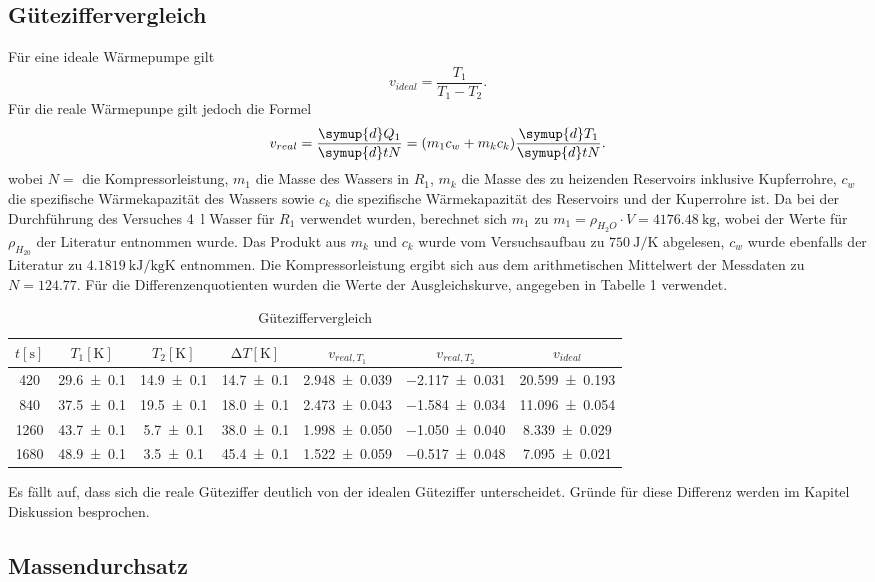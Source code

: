 \subsection{Güteziffervergleich}
Für eine ideale Wärmepumpe gilt
\begin{equation}
  v_{ideal} = \frac{T_1}{T_1-T_2}.
\end{equation}
Für die reale Wärmepunpe gilt jedoch die Formel
\begin{equation}
  v_{real}= \frac{\symup{d} Q_1}{\symup{d} tN} = (m_1c_w+m_kc_k)\frac{\symup{d} T_1}{\symup{d} tN}.
\end{equation}
wobei $ N = $ die Kompressorleistung, $ m_1$ die Masse des Wassers in $ R_1 $, $m_k$ die Masse des zu heizenden Reservoirs inklusive Kupferrohre, $ c_w $ die spezifische Wärmekapazität des Wassers sowie $ c_k $ die spezifische Wärmekapazität des Reservoirs und der Kuperrohre ist.
Da bei der Durchführung des Versuches \SI{4}{\litre} Wasser für $R_1$ verwendet wurden, berechnet sich $m_1$ zu $m_1 = \rho_{H_2O} \cdot V = \SI{4176.48}{\kilogram}$, wobei der Werte für $\rho_{H_20}$ der Literatur entnommen wurde.
Das Produkt aus $m_k$ und $c_k$ wurde vom Versuchsaufbau zu $\SI{750}{\joule\per\kelvin}$ abgelesen, $c_w$ wurde ebenfalls der Literatur zu $\SI{4,1819}{\kilo\joule\per\kilogram\kelvin}$ entnommen.
Die Kompressorleistung ergibt sich aus dem arithmetischen Mittelwert der Messdaten zu $N=124.77$.
Für die Differenzenquotienten wurden die Werte der Ausgleichskurve, angegeben in Tabelle 1 verwendet.

\begin{table}
  \centering
  \caption{Güteziffervergleich}
  \label{tab:tabelle1}
\begin{tabular}{c c c c c c c}
  \toprule
  {$t [\si{\second}]$} & {$T_1 [\si{\kelvin}]$} & {$T_2 [\si{\kelvin}]$} & {$\increment{T} [\si{\kelvin}]$} & {$v_{real, T_1}$}  & {$v_{real, T_2}$} & {$v_{ideal}$}\\
  \midrule
  \num{420} & \num{29.6 +- 0.1} & \num{14.9 +- 0.1} & \num{14.7 +- 0.1} & \num{2.948 +- 0.039} & \num{-2.117 +- 0.031} & \num{20.599 +- 0.193} \\
  \num{840} & \num{37.5 +- 0.1} & \num{19.5 +- 0.1} & \num{18.0 +- 0.1} & \num{2.473 +- 0.043} & \num{-1.584 +- 0.034} & \num{11.096 +- 0.054}  \\
  \num{1260} & \num{43.7 +- 0.1} & \num{5.7 +- 0.1} & \num{38.0 +- 0.1} & \num{1.998 +- 0.050} & \num{-1.050 +- 0.040} & \num{8.339 +- 0.029}  \\
  \num{1680} & \num{48.9 +- 0.1} & \num{3.5 +- 0.1} & \num{45.4 +- 0.1} & \num{1.522 +- 0.059} & \num{-0.517 +- 0.048} & \num{7.095 +- 0.021}  \\
  \bottomrule
\end{tabular}
\end{table}
Es fällt auf, dass sich die reale Güteziffer deutlich von der idealen Güteziffer unterscheidet.
Gründe für diese Differenz werden im Kapitel Diskussion besprochen.
\subsection{Massendurchsatz}
